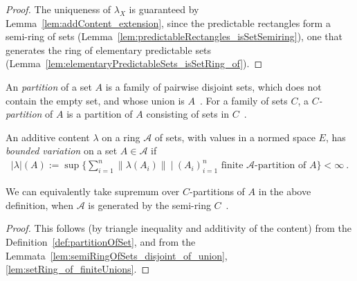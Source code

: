 \begin{proof}
The uniqueness of $\lambda_X$ is guaranteed by Lemma~\ref{lem:addContent_extension},
since the predictable rectangles form a semi-ring of sets
(Lemma~\ref{lem:predictableRectangles_isSetSemiring}),
one that generates the ring of elementary predictable sets
(Lemma~\ref{lem:elementaryPredictableSets_isSetRing_of}).
\end{proof}

\begin{definition}\label{def:partitionOfSet}
  \mathlibok
  An \emph{partition} of a set $A$ is a family of pairwise disjoint sets,
  which does not contain the empty set, and whose union is $A$~.
  For a family of sets $C$, a \emph{$C$-partition} of $A$ is a partition of $A$ consisting of sets in $C$~.
\end{definition}

\begin{definition}\label{def:contentBoundedVariation}
An additive content $\lambda$ on a ring $\mathcal{A}$ of sets, with values in a normed space $E$,
has \emph{bounded variation} on a set $A \in \mathcal{A}$ if
\begin{align*}
  \vert \lambda \vert(A)
  := \sup
  \Big\{
    \sum_{i=1}^n \| \lambda(A_i) \|
    \:\Big|\:
    (A_i)_{i=1}^n \text{ finite } \mathcal{A}\text{-partition of } A
  \Big\}
  < \infty
  \: .
\end{align*}
\end{definition}

\begin{lemma}\label{lem:contentBoundedVariation_equivOnGenerator}
  We can equivalently take supremum over $C$-partitions of $A$ in the above
  definition, when $\mathcal{A}$ is generated by the semi-ring $C$~.
\end{lemma}

\begin{proof}
  This follows (by triangle inequality and additivity of the content)
  from the Definition~\ref{def:partitionOfSet},
  and from the Lemmata~\ref{lem:semiRingOfSets_disjoint_of_union},
  \ref{lem:setRing_of_finiteUnions}.
\end{proof}



